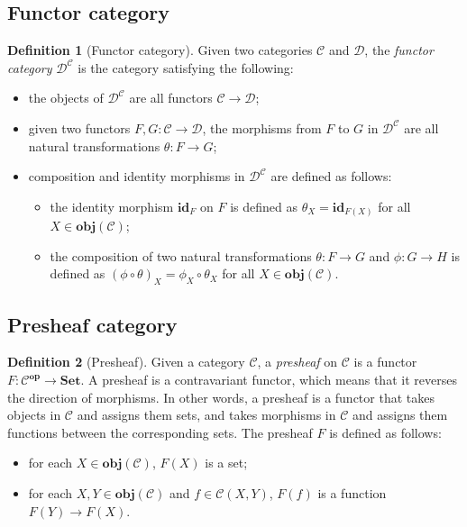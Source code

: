 \documentclass[12pt,twoside,a4paper]{report}
\theoremstyle{definition}
\newtheorem{definition}{Definition}
\theoremstyle{definition}
\theoremstyle{definition}
\theoremstyle{definition}
\begin{document}
        \subsection{Functor category}
        \begin{definition}[Functor category]
            Given two categories $\mathcal{C}$ and $\mathcal{D}$, the \emph{functor category} $\mathcal{D}^{\mathcal{C}}$ is the category satisfying the following:
            \begin{itemize}
                \item 
                    the objects of $\mathcal{D}^{\mathcal{C}}$ are all functors $\mathcal{C} \to \mathcal{D}$;
                \item 
                    given two functors $F,G: \mathcal{C} \to \mathcal{D}$, the morphisms from $F$ to $G$ in $\mathcal{D}^{\mathcal{C}}$ are all natural transformations $\theta : F \to G$;
                \item
                    composition and identity morphisms in $\mathcal{D}^{\mathcal{C}}$ are defined as follows:
                    \begin{itemize}
                        \item 
                            the identity morphism $\textbf{id}_F$ on $F$ is defined as $\theta_X = \textbf{id}_{F(X)}$ for all $X \in \textbf{obj}(\mathcal{C})$;
                        \item
                            the composition of two natural transformations $\theta : F \to G$ and $\phi : G \to H$ is defined as $(\phi \circ \theta)_X = \phi_X \circ \theta_X$ for all $X \in \textbf{obj}(\mathcal{C})$.
                    \end{itemize}
            \end{itemize}
        \end{definition}

        \subsection{Presheaf category}
        \begin{definition}[Presheaf]
            Given a category $\mathcal{C}$, a \emph{presheaf} on $\mathcal{C}$ is a functor $F: \mathcal{C}^{\textbf{op}} \to \textbf{Set}$.
            A presheaf is a contravariant functor, which means that it reverses the direction of morphisms.
            In other words, a presheaf is a functor that takes objects in $\mathcal{C}$ and assigns them sets, and takes morphisms in $\mathcal{C}$ and assigns them functions between the corresponding sets.
            The presheaf $F$ is defined as follows:
            \begin{itemize}
                \item 
                    for each $X \in \textbf{obj}(\mathcal{C})$, $F(X)$ is a set;
                \item
                    for each $X, Y \in \textbf{obj}(\mathcal{C})$ and $f \in \mathcal{C}{(X,Y)}$, $F(f)$ is a function $F(Y) \to F(X)$.
            \end{itemize}
        \end{definition}
\end{document}
